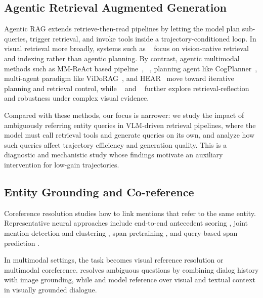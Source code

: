 \documentclass{article} %
\begin{document}

\subsection{Agentic Retrieval Augmented Generation}
Agentic RAG extends retrieve-then-read pipelines by letting the model plan sub-queries, trigger retrieval, and invoke tools inside a trajectory-conditioned loop. In visual retrieval more broadly, systems such as ~\citep{yu2025visrag,sun2025visrag} focus on vision-native retrieval and indexing rather than agentic planning. By contrast, agentic multimodal methods such as MM-ReAct based pipeline~\citep{yang2023mm}, ~\citep{li2024benchmarking}, planning agent like CogPlanner~\citep{yu2025cogplanner}, multi-agent paradigm like ViDoRAG~\citep{wang2025vidorag}, and HEAR~\citep{chen2025hear} move toward iterative planning and retrieval control, while ~\citep{zhang2024mr} and ~\citep{qi2024rora} further explore retrieval-reflection and robustness under complex visual evidence.

Compared with these methods, our focus is narrower: we study the impact of ambiguously referring entity queries in VLM-driven retrieval pipelines, where the model must call retrieval tools and generate queries on its own, and analyze how such queries affect trajectory efficiency and generation quality. This is a diagnostic and mechanistic study whose findings motivate an auxiliary intervention for low-gain trajectories.

\subsection{Entity Grounding and Co-reference}
Coreference resolution studies how to link mentions that refer to the same entity. Representative neural approaches include end-to-end antecedent scoring \citep{lee2017end}, joint mention detection and clustering \citep{zhang2018neural}, span pretraining \citep{joshi2020spanbert}, and query-based span prediction \citep{wu2020corefqa}.

In multimodal settings, the task becomes visual reference resolution or multimodal coreference. \citep{kang2019dual} resolves ambiguous questions by combining dialog history with image grounding, while \citep{guo2022gravl} and \citep{inadumi2025disambiguating} model reference over visual and textual context in visually grounded dialogue.
\end{document}
